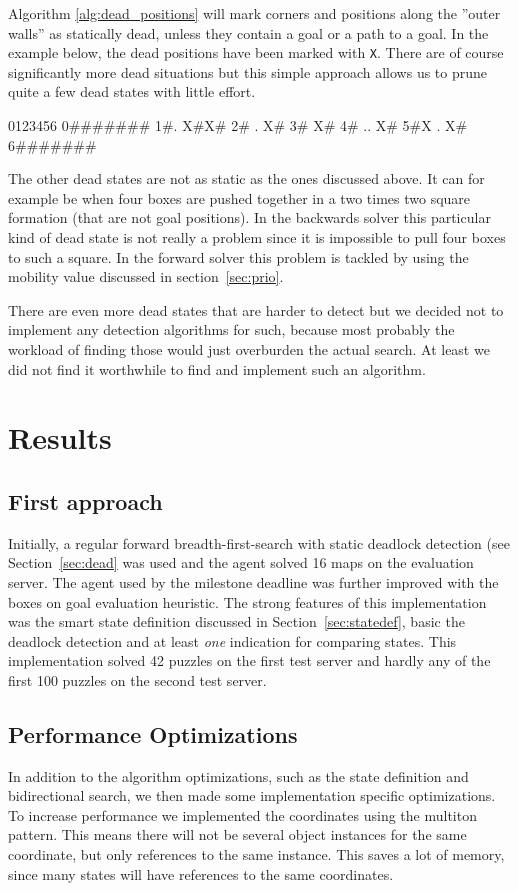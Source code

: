 \documentclass[a4paper,11pt]{article}
\begin{document}
Algorithm \ref{alg:dead_positions} will mark corners and positions along the
''outer walls'' as statically dead, unless they contain a goal or a path to a goal.
In the example below, the dead positions have been marked with \verb!X!.
There are of course significantly more dead situations but this simple approach 
allows us to prune quite a few dead states with little effort.

\begin{verbatimtab}
 0123456
0#######
1#. X#X#
2# .  X#
3#    X#
4# .. X#
5#X . X#
6#######

\end{verbatimtab}

The other dead states are not as static as the ones discussed above. 
It can for example be when four boxes are pushed together in a two times two square formation
(that are not goal positions).
In the backwards solver this particular kind of dead state is not really a problem since it is
impossible to pull four boxes to such a square.
In the forward solver this problem is tackled by using the mobility value discussed in section~\ref{sec:prio}.

There are even more dead states that are harder to detect but we decided not
to implement any detection algorithms for such, because most probably the
workload of finding those would just overburden the actual search.
At least we did not find it worthwhile to find and implement such an algorithm.

\section{Results}

\subsection{First approach}
Initially, a regular forward breadth-first-search with static deadlock detection (see Section~\ref{sec:dead}
was used and the agent solved 16 maps on the evaluation server.
The agent used by the milestone deadline was further improved with the boxes on goal evaluation heuristic.
The strong features of this implementation was the smart state definition
discussed in Section~\ref{sec:statedef}, basic the deadlock detection and at least \emph{one} indication
for comparing states.
This implementation solved 42 puzzles on the first test server and hardly any of the first 100 puzzles on the 
second test server.

\subsection{Performance Optimizations}
\label{sec:opt}
In addition to the algorithm optimizations, such as the state definition and bidirectional search,
we then made some implementation specific optimizations.
To increase performance we implemented
the coordinates using the multiton pattern.
This means there will not be several object instances for the same coordinate,
but only references to the same instance.
This saves a lot of memory, since many states will have references to the same coordinates.
\end{document}

